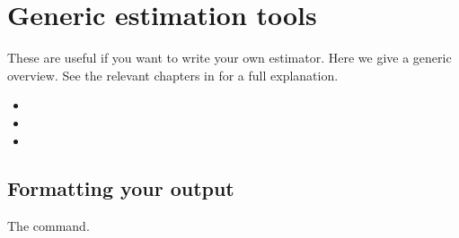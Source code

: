 \section{Generic estimation tools}
\label{sec:est-blocks}

These are useful if you want to write your own estimator. Here we give
a generic overview. See the relevant chapters in \GUG{} for a full explanation.

\begin{itemize}
\item {}
\item {}
\item {}
\end{itemize}

\subsection{Formatting your output}

The  command.

\label{LastPage}


